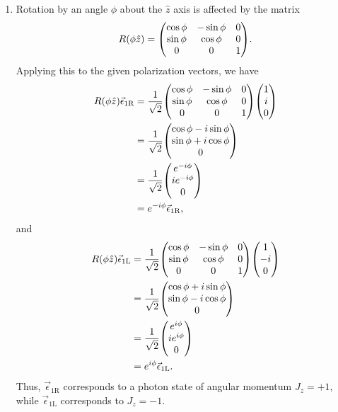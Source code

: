 \documentclass[12pt]{article}
\begin{document}
\begin{enumerate}[label=(\alph*)]
    \item Rotation by an angle $\phi$ about the $\hat{z}$ axis is affected by the matrix
    \[ R(\phi\hat{z}) = \mqty(\cos\phi & -\sin\phi & 0 \\ \sin\phi & \cos\phi & 0 \\ 0 & 0 & 1). \]
    Applying this to the given polarization vectors, we have
    \begin{align*}
        R(\phi\hat{z})\vec{\epsilon}_{1\text{R}} &= \frac{1}{\sqrt{2}}\mqty(\cos\phi & -\sin\phi & 0 \\ \sin\phi & \cos\phi & 0 \\ 0 & 0 & 1)\mqty(1\\i\\0) \\
        &= \frac{1}{\sqrt{2}}\mqty(\cos\phi - i\sin\phi \\ \sin\phi + i\cos\phi \\ 0) \\
        &= \frac{1}{\sqrt{2}}\mqty(e^{-i\phi} \\ ie^{-i\phi} \\ 0) \\
        &= e^{-i\phi}\vec{\epsilon}_{1\text{R}},
    \end{align*}
    and 
    \begin{align*}
        R(\phi\hat{z})\vec{\epsilon}_{1\text{L}} &= \frac{1}{\sqrt{2}}\mqty(\cos\phi & -\sin\phi & 0 \\ \sin\phi & \cos\phi & 0 \\ 0 & 0 & 1)\mqty(1\\-i\\0) \\
        &= \frac{1}{\sqrt{2}}\mqty(\cos\phi + i\sin\phi \\ \sin\phi - i\cos\phi \\ 0) \\
        &= \frac{1}{\sqrt{2}}\mqty(e^{i\phi} \\ ie^{i\phi} \\ 0) \\
        &= e^{i\phi}\vec{\epsilon}_{1\text{L}}.
    \end{align*}
    Thus, $\vec{\epsilon}_{1\text{R}}$ corresponds to a photon state of angular momentum $J_z = +1$, while $\vec{\epsilon}_{1\text{L}}$ corresponds to $J_z = -1$.
    

\end{enumerate}
\end{document}
